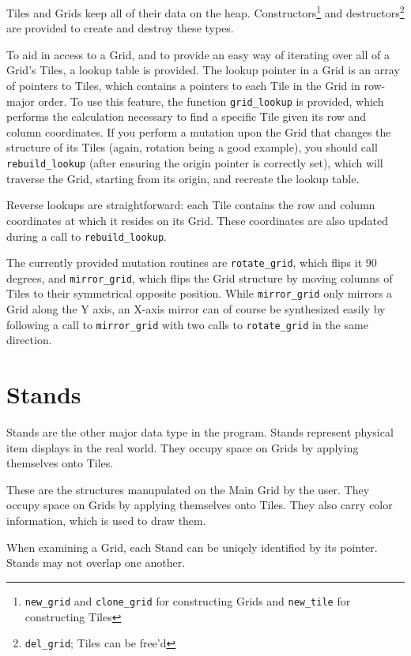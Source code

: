 \documentclass{report}
\begin{document}
Tiles and Grids keep all of their data on the heap. Constructors\footnote{
	\texttt{new_grid} and \texttt{clone_grid} for constructing Grids
	and \texttt{new_tile} for constructing Tiles}
and destructors\footnote{\texttt{del_grid}; Tiles can be free'd} are provided
to create and destroy these types.

To aid in access to a Grid, and to provide an easy way of iterating over all
of a Grid's Tiles, a lookup table is provided. The lookup pointer in a Grid is
an array of pointers to Tiles, which contains a pointers to each Tile in the
Grid in row-major order. To use this feature, the function \texttt{grid_lookup}
is provided, which performs the calculation necessary to find a specific Tile
given its row and column coordinates. If you perform a mutation upon the Grid
that changes the structure of its Tiles (again, rotation being a good example),
you should call \texttt{rebuild_lookup} (after ensuring the origin pointer
is correctly set), which will traverse the Grid, starting from its origin, and
recreate the lookup table.

Reverse lookups are straightforward: each Tile contains the row and column
coordinates at which it resides on its Grid. These coordinates are also
updated during a call to \texttt{rebuild_lookup}.

The currently provided mutation routines are \texttt{rotate_grid}, which
flips it 90 degrees, and \texttt{mirror_grid}, which flips the Grid structure
by moving columns of Tiles to their symmetrical opposite position.
While \texttt{mirror_grid} only mirrors a Grid along the Y axis, an X-axis
mirror can of course be synthesized easily by following a call to
\texttt{mirror_grid} with two calls to \texttt{rotate_grid}
in the same direction.

\section{Stands}
Stands are the other major data type in the program. Stands represent physical
item displays in the real world. They occupy space on Grids by applying
themselves onto Tiles.

These are the structures manupulated on the Main Grid by the user. They occupy
space on Grids by applying themselves onto Tiles. They also carry color
information, which is used to draw them.

When examining a Grid, each Stand can be uniqely identified by its
pointer. Stands may not overlap one another.
\end{document}
